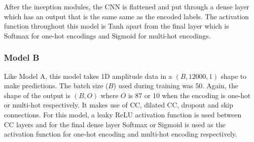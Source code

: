 \documentclass[12pt]{article}
\begin{document}
    After the inception modules, the CNN is flattened and put through a dense layer which has an output that is the same same as the encoded labels. The activation function throughout this model is Tanh apart from the final layer which is Softmax for one-hot encodings and Sigmoid for multi-hot encodings.
    
    
    
    \subsubsection{Model B}
    \label{sec:design_modelB}
    
    Like Model A, this model takes 1D amplitude data in a $(B, 12000, 1)$ shape to make predictions. The batch size ($B$) used during training was 50. Again, the shape of the output is $(B, O)$ where $O$ is 87 or 10 when the encoding is one-hot or multi-hot respectively. It makes use of CC, dilated CC, dropout and skip connections. For this model, a leaky ReLU activation function is used between CC layers and for the final dense layer Softmax or Sigmoid is used as the activation function for one-hot encoding and multi-hot encoding respectively.\medskip
\end{document}
